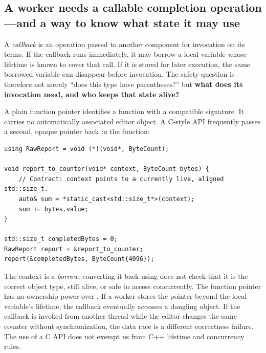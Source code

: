 \subsection{A worker needs a callable completion operation---and a way to know what state it may use}\label{01-foundations-i-ch004-a-worker-needs-a-callable-completion-operationand-a-way-to-know-what-state-it-may-use}

\hypertarget{01-foundations-i-ch004-a-worker-needs-a-callable-completion-operationand-a-way-to-know-what-state-it-may-use}{}

A \emph{callback} is an operation passed to another component for invocation on its terms. If the callback runs immediately, it may borrow a local variable whose lifetime is known to cover that call. If it is stored for later execution, the same borrowed variable can disappear before invocation. The safety question is therefore not merely ``does this type have parentheses?'' but \textbf{what does its invocation need, and who keeps that state alive?}

A plain function pointer identifies a function with a compatible signature. It carries no automatically associated editor object. A C-style API frequently passes a second, opaque pointer back to the function:

\begin{verbatim}
using RawReport = void (*)(void*, ByteCount);

void report_to_counter(void* context, ByteCount bytes) {
    // Contract: context points to a currently live, aligned std::size_t.
    auto& sum = *static_cast<std::size_t*>(context);
    sum += bytes.value;
}

std::size_t completedBytes = 0;
RawReport report = &report_to_counter;
report(&completedBytes, ByteCount{4096});
\end{verbatim}

The  context is a \emph{borrow}: converting it back using  does not check that it is the correct object type, still alive, or safe to access concurrently. The function pointer has no ownership power over . If a worker stores the pointer beyond the local variable's lifetime, the callback eventually accesses a dangling object. If the callback is invoked from another thread while the editor changes the same counter without synchronization, the data race is a different correctness failure. The use of a C API does not exempt us from C++ lifetime and concurrency rules.

